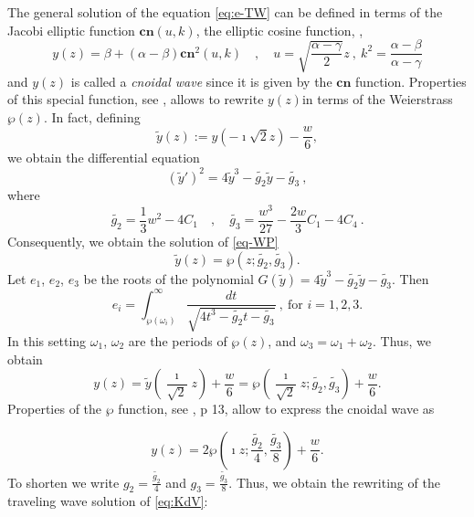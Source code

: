 \documentclass[a4paper,12pt]{article}
\newcommand{\cn}{\textbf{cn}}
\begin{document}
The general solution of the equation \eqref{eq:e-TW}  can be defined in terms of the Jacobi elliptic function $\cn (u,k)$, the elliptic cosine function, \cite{kudryashov2009, drazin1989},
\begin{equation*}
    y(z)= \beta +(\alpha-\beta)\cn^2 \left(
    u , k
    \right)\quad , \quad u= \sqrt{\frac{\alpha-\gamma}{2}}z \ , \ k^2 =\frac{\alpha-\beta}{\alpha-\gamma}
\end{equation*}
and $y(z)$ is called a {\it cnoidal wave} since it is given by the $\cn $ function. Pro\-perties of this special function, see \cite{chandrasekharan2012elliptic}, allows to rewrite $y(z)$in terms of the Weierstrass $\wp (z)$. In fact, defining 
\begin{equation*}
    \widetilde{y}(z):= y(- \imath\sqrt{2} z )-\frac{w}{6} ,
\end{equation*}
we obtain the differential equation
\begin{equation}\label{eq-WP}
    \left(
    \widetilde{y}'
    \right)^2 =
    4\widetilde{y}^3- \widetilde{g_2 } \widetilde{y} - \widetilde{ g_3 } \ ,
\end{equation}
where 
\begin{equation*}
  \widetilde{g_2 } = \frac{1}{3}w^2 -4C_1 \quad , \quad   
  \widetilde{ g_3 } = \frac{w^3 }{27} - \frac{2w}{3}C_1 -4C_4 \ .
\end{equation*}
Consequently, we obtain the solution of \eqref{eq-WP} 
\[
 \widetilde{y}(z) = \wp(z; \widetilde{g_2 } ,  \widetilde{ g_3 } ).
\]
Let $e_1 $, $e_2 $, $e_3 $ be the roots of the polynomial $G(\widetilde{y}) =4\widetilde{y}^3-\widetilde{g_2 } \widetilde{y} - \widetilde{ g_3 }$. Then
\begin{equation*}
    e_i = \int_{\wp(\omega_i )}^\infty  \frac{dt}{\sqrt{4t^3 -\widetilde{g_2 } t -\widetilde{ g_3 } }} \ , \ \textrm{for } i=1, 2, 3.
\end{equation*}
In this setting $\omega_1$, $\omega_2$ are the periods of $\wp (z)$, and $\omega_3 =\omega_1 + \omega_2$. Thus,  we obtain
\begin{equation*}
    y(z)=\widetilde{y}\left(\frac{\imath}{\sqrt{2}}z 
    \right)+\frac{w}{6} = 
    \wp\left(\frac{\imath}{\sqrt{2}}z; \widetilde{g_2 }  , \widetilde{g_3 }  \right) +\frac{w}{6} 
    .\end{equation*}
Properties of the $\wp$ function, see \cite{pastras2020weierstrass}, p 13, allow to express the cnoidal wave as

\begin{equation*}
    y(z)=  
    2\wp\left(\imath z; \frac{\widetilde{g_2 }}{4}  , \frac{\widetilde{g_3 }}{8}  \right) +\frac{w}{6} 
    .
\end{equation*}
To shorten we  write $g_2= \frac{\widetilde{g_2 }}{4}$ and $ g_3 =\frac{\widetilde{g_3 }}{8}$. Thus, we obtain the rewriting of the traveling wave solution of  \eqref{eq:KdV}:
\end{document}

